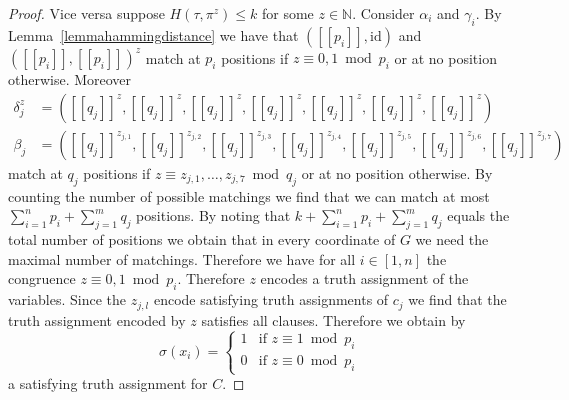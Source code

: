 \documentclass{article}
\newcommand{\llbracket}{[\![}
\newcommand{\rrbracket}{]\!]}
\begin{document}
\begin{proof}
Vice versa suppose $H(\tau,\pi^z) \leq k$ for some $z \in \mathbb{N}$. Consider $\alpha_i$ and $\gamma_i$. By Lemma~\ref{lemmahammingdistance} we have that $(\llbracket  p_i \rrbracket, \mathrm{id})$ and $(\llbracket  p_i \rrbracket, \llbracket  p_i \rrbracket)^z$ match at $p_i$ positions if $z \equiv 0,1 \bmod p_i$ or at no position otherwise. Moreover
\begin{align*}
\delta_j^z&= (\llbracket  q_j \rrbracket^z, \llbracket  q_j \rrbracket^z, \llbracket  q_j \rrbracket^z, \llbracket  q_j \rrbracket^z, \llbracket  q_j \rrbracket^z, \llbracket  q_j \rrbracket^z, \llbracket  q_j \rrbracket^z)\\
\beta_j&= (\llbracket  q_j \rrbracket^{z_{j,1}}, \llbracket  q_j \rrbracket^{z_{j,2}}, \llbracket  q_j \rrbracket^{z_{j,3}}, \llbracket  q_j \rrbracket^{z_{j,4}}, \llbracket  q_j \rrbracket^{z_{j,5}}, \llbracket  q_j \rrbracket^{z_{j,6}}, \llbracket  q_j \rrbracket^{z_{j,7}})
\end{align*}
match at $q_j$ positions if $z \equiv z_{j,1},\dots,z_{j,7} \bmod q_j$ or at no position otherwise. By counting the number of possible matchings we find that we can match at most $\sum_{i=1}^n p_i + \sum_{j=1}^m q_j$ positions. By noting that $k+\sum_{i=1}^n p_i + \sum_{j=1}^m q_j$ equals the total number of positions we obtain that in every coordinate of $G$ we need the maximal number of matchings. Therefore we have for all $i \in [1,n]$ the congruence $z \equiv 0,1 \bmod p_i$. Therefore $z$ encodes a truth assignment of the variables. Since the $z_{j,l}$ encode satisfying truth assignments of $c_j$ we find that the truth assignment encoded by $z$ satisfies all clauses. Therefore we obtain by
\begin{displaymath}
\sigma(x_i) = \begin{cases}
1 & \text{if } z \equiv 1 \bmod p_i\\
0 & \text{if } z \equiv 0 \bmod p_i
\end{cases}
\end{displaymath}
a satisfying truth assignment for $C$.
\end{proof}
\end{document}
